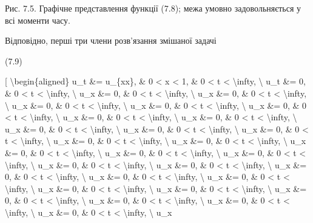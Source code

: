 \documentclass[
]{article}
\begin{document}
Рис. 7.5. Графічне представлення функції (7.8); межа умовно
задовольняється у всі моменти часу.

Відповідно, перші три члени розв'язання змішаної задачі

(7.9)

{[} \textbackslash begin\{aligned\} u\_t \&= u\_\{xx\}, \& 0 \textless{}
x \textless{} 1, \& 0 \textless{} t \textless{} \textbackslash infty,
\textbackslash{} u\_t \&= 0, \& 0 \textless{} t \textless{}
\textbackslash infty, \textbackslash{} u\_x \&= 0, \& 0 \textless{} t
\textless{} \textbackslash infty, \textbackslash{} u\_x \&= 0, \& 0
\textless{} t \textless{} \textbackslash infty, \textbackslash{} u\_x
\&= 0, \& 0 \textless{} t \textless{} \textbackslash infty,
\textbackslash{} u\_x \&= 0, \& 0 \textless{} t \textless{}
\textbackslash infty, \textbackslash{} u\_x \&= 0, \& 0 \textless{} t
\textless{} \textbackslash infty, \textbackslash{} u\_x \&= 0, \& 0
\textless{} t \textless{} \textbackslash infty, \textbackslash{} u\_x
\&= 0, \& 0 \textless{} t \textless{} \textbackslash infty,
\textbackslash{} u\_x \&= 0, \& 0 \textless{} t \textless{}
\textbackslash infty, \textbackslash{} u\_x \&= 0, \& 0 \textless{} t
\textless{} \textbackslash infty, \textbackslash{} u\_x \&= 0, \& 0
\textless{} t \textless{} \textbackslash infty, \textbackslash{} u\_x
\&= 0, \& 0 \textless{} t \textless{} \textbackslash infty,
\textbackslash{} u\_x \&= 0, \& 0 \textless{} t \textless{}
\textbackslash infty, \textbackslash{} u\_x \&= 0, \& 0 \textless{} t
\textless{} \textbackslash infty, \textbackslash{} u\_x \&= 0, \& 0
\textless{} t \textless{} \textbackslash infty, \textbackslash{} u\_x
\&= 0, \& 0 \textless{} t \textless{} \textbackslash infty,
\textbackslash{} u\_x \&= 0, \& 0 \textless{} t \textless{}
\textbackslash infty, \textbackslash{} u\_x \&= 0, \& 0 \textless{} t
\textless{} \textbackslash infty, \textbackslash{} u\_x \&= 0, \& 0
\textless{} t \textless{} \textbackslash infty, \textbackslash{} u\_x
\&= 0, \& 0 \textless{} t \textless{} \textbackslash infty,
\textbackslash{} u\_x \&= 0, \& 0 \textless{} t \textless{}
\textbackslash infty, \textbackslash{} u\_x \&= 0, \& 0 \textless{} t
\textless{} \textbackslash infty, \textbackslash{} u\_x \&= 0, \& 0
\textless{} t \textless{} \textbackslash infty, \textbackslash{} u\_x
\&= 0, \& 0 \textless{} t \textless{} \textbackslash infty,
\textbackslash{} u\_x \&= 0, \& 0 \textless{} t \textless{}
\textbackslash infty, \textbackslash{} u\_x \&= 0, \& 0 \textless{} t
\textless{} \textbackslash infty, \textbackslash{} u\_x \&= 0, \& 0
\textless{} t \textless{} \textbackslash infty, \textbackslash{} u\_x
\end{document}
